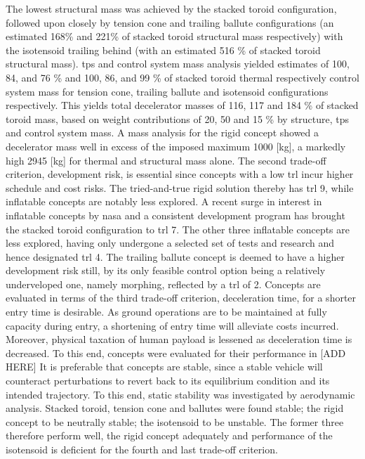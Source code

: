 The lowest structural mass was achieved by the stacked toroid configuration, followed upon closely by tension cone and trailing ballute configurations (an estimated 168\% and 221\% of stacked toroid structural mass respectively) with the isotensoid trailing behind (with an estimated 516 \% of stacked toroid structural mass). \acrfull{tps} and control system mass analysis yielded estimates of 100, 84, and 76 \% and 100, 86, and 99 \% of stacked toroid thermal respectively control system mass for tension cone, trailing ballute and isotensoid configurations respectively. This yields total decelerator masses of 116, 117 and 184 \% of stacked toroid mass, based on weight contributions of 20, 50 and 15 \% by structure, \gls{tps} and control system mass. A mass analysis for the rigid concept showed a decelerator mass well in excess of the imposed maximum 1000 [kg], a markedly high 2945 [kg] for thermal and structural mass alone.
\newline
\newline
The second trade-off criterion, development risk, is essential since concepts with a low \acrfull{trl} incur higher schedule and cost risks. The tried-and-true rigid solution thereby has \gls{trl} 9, while inflatable concepts are notably less explored. A recent surge in interest in inflatable concepts by \gls{nasa} and a consistent development program has brought the stacked toroid configuration to \gls{trl} 7. The other three inflatable concepts are less explored, having only undergone a selected set of tests and research and hence designated \gls{trl} 4. The trailing ballute concept is deemed to have a higher development risk still, by its only feasible control option being a relatively underveloped one, namely morphing, reflected by a \gls{trl} of 2.
\newline
\newline
Concepts are evaluated in terms of the third trade-off criterion, deceleration time, for a shorter entry time is desirable. As ground operations are to be maintained at fully capacity during entry, a shortening of entry time will alleviate costs incurred. Moreover, physical taxation of human payload is lessened as deceleration time is decreased. To this end, concepts were evaluated for their performance in [ADD HERE]
\newline
\newline
It is preferable that concepts are stable, since a stable vehicle will counteract perturbations to revert back to its equilibrium condition and its intended trajectory. To this end, static stability was investigated by aerodynamic analysis. Stacked toroid, tension cone and ballutes were found stable; the rigid concept to be neutrally stable; the isotensoid to be unstable. The former three therefore perform well, the rigid concept adequately and performance of the isotensoid is deficient for the fourth and last trade-off criterion.

